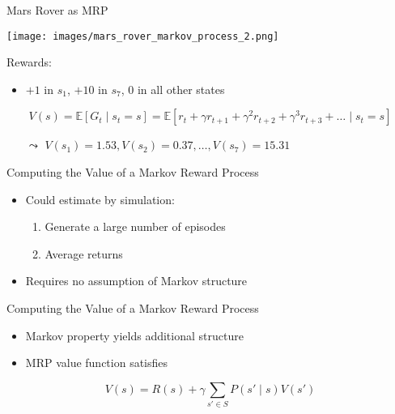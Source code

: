 \documentclass[aspectratio=169]{../latex_main/tntbeamer}  %
\begin{document}
\begin{frame}[c]{Mars Rover as MRP}
	
	\begin{center}
		\texttt{[image: images/mars\_rover\_markov\_process\_2.png]}
	\end{center}
	
	Rewards:
	\begin{itemize}
		\item $+1$ in $s_1$, $+10$ in $s_7$, $0$ in all other states
	\end{itemize}

$$ V(s)  = \mathbb{E}[G_t \mid s_t=s] = \mathbb{E}[r_t + \gamma r_{t+1} + \gamma^2 r_{t+2} + \gamma^3 r_{t+3} + \ldots \mid s_t = s]$$

	\begin{itemize}
		\item[$\leadsto$] $V(s_1) = 1.53, V(s_2) = 0.37, \ldots, V(s_7) = 15.31$
	\end{itemize}
	
\end{frame}
\begin{frame}[c]{Computing the Value of a Markov Reward Process}
	
	\begin{itemize}
		\item Could estimate by simulation:
		\begin{enumerate}
			\item Generate a large number of episodes
			\item Average returns
		\end{enumerate}
		\item Requires no assumption of Markov structure
	\end{itemize}
	
\end{frame}
\begin{frame}[c]{Computing the Value of a Markov Reward Process}
	
	\begin{itemize}
		\item Markov property yields additional structure
		\item MRP value function satisfies
	\end{itemize}

$$V(s) = R(s) + \gamma \sum_{s' \in S} P(s'\mid s) V(s')$$
	
\end{frame}
\end{document}

